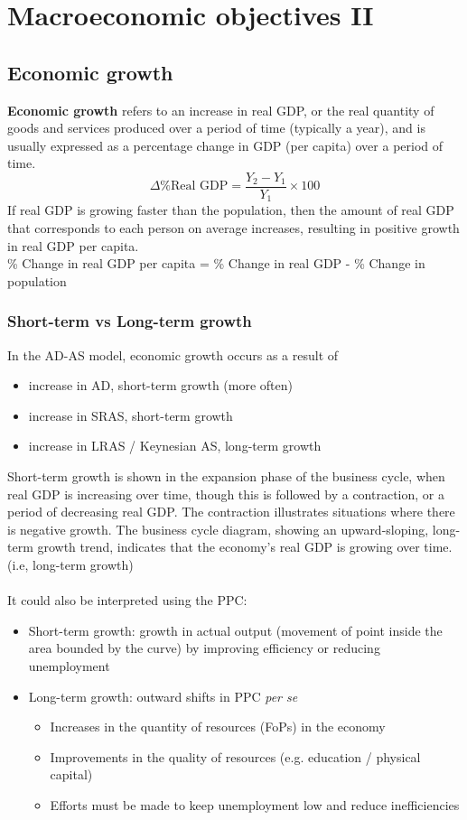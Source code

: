 \documentclass[a4paper,12pt]{article}
\newcommand{\needbold}[1]{\textcolor{red!70!black}{\textbf{#1}}}
\begin{document}
\section{Macroeconomic objectives II}\label{sec:macro-obj-2}
\subsection{Economic growth}
\needbold{Economic growth} refers to an increase in real GDP, or the real quantity of goods and services produced over a period of time (typically a year), and is usually expressed as a percentage change in GDP (per capita) over a period of time.
\[\Delta \%\text{Real GDP}=\dfrac{Y_2-Y_1}{Y_1}\times 100\]
If real GDP is growing faster than the population, then the amount of real GDP that corresponds to each person on average increases, resulting in positive growth in real GDP per capita.\\
\% Change in real GDP per capita = \% Change in real GDP - \% Change in population
\subsubsection*{Short-term vs Long-term growth}
In the AD-AS model, economic growth occurs as a result of
\begin{itemize}
  \item increase in AD, short-term growth (more often)
  \item increase in SRAS, short-term growth
  \item increase in LRAS / Keynesian AS, long-term growth
\end{itemize}
Short-term growth is shown in the expansion phase of the business cycle, when real GDP is increasing over time, though this is followed by a contraction, or a period of decreasing real GDP. The contraction illustrates situations where there is negative growth. 
The business cycle diagram, showing an upward-sloping, long-term growth trend, indicates that the economy's real GDP is growing over time. (i.e, long-term growth)\\\\
It could also be interpreted using the PPC: 
\begin{itemize}
  \item Short-term growth: growth in actual output (movement of point inside the area bounded by the curve) by improving efficiency or reducing unemployment
  \item Long-term growth: outward shifts in PPC \emph{per se}
  \begin{itemize}
    \item Increases in the quantity of resources (FoPs) in the economy
    \item Improvements in the quality of resources (e.g. education / physical capital)
    \item Efforts must be made to keep unemployment low and reduce inefficiencies
  \end{itemize} 
\end{itemize}
\end{document}

